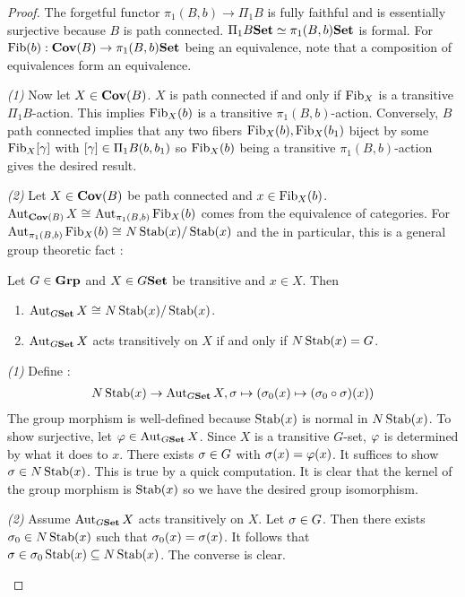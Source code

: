 \documentclass[./main.tex]{subfiles}
\begin{document}
\begin{proof}
  The forgetful functor $\pi_1(B,b) \to \Pi_1B$ is fully faithful
  and is essentially surjective because $B$ is path connected.
  $\Pi_1 B \mathbf{Set} \simeq \pi_1(B,b)\mathbf{Set}$ is formal.
  For $\operatorname{Fib}(b) : \mathbf{Cov}(B) \to \pi_1(B,b)\mathbf{Set}$ being an equivalence,
  note that a composition of equivalences form an equivalence. 

  \textit{(1)}
  Now let $X \in \mathbf{Cov}(B)$.
  $X$ is path connected if and only if $\operatorname{Fib}_X$ is a transitive 
  $\Pi_1B$-action. 
  This implies $\operatorname{Fib}_X(b)$ is a transitive $\pi_1(B,b)$-action. 
  Conversely, $B$ path connected implies 
  that any two fibers $\operatorname{Fib}_X(b), \operatorname{Fib}_X(b_1)$ biject by some 
  $\operatorname{Fib}_X[\gamma]$ with $[\gamma] \in \Pi_1B (b,b_1)$ so 
  $\operatorname{Fib}_X(b)$ being a transitive $\pi_1(B,b)$-action gives the desired result.
  
  \textit{(2)}
  Let $X \in\mathbf{Cov}(B)$ be path connected and $x \in \operatorname{Fib}_X(b)$.
  $\operatorname{Aut}_{\mathbf{Cov}(B)} X \cong_{} \operatorname{Aut}_{\pi_1(B,b)} \operatorname{Fib}_X(b)$ comes from 
  the equivalence of categories. 
  For $\operatorname{Aut}_{\pi_1(B,b)} \operatorname{Fib}_X(b) \cong_{} N\operatorname{Stab}(x)/\operatorname{Stab}(x)$
  and the in particular,
  this is a general group theoretic fact : 
  \begin{lem}
    Let $G \in \mathbf{Grp}$ and $X \in G\mathbf{Set}$ be transitive and $x \in X$.
    Then 
    \begin{enumerate}
      \item $\operatorname{Aut}_{G\mathbf{Set}} X \cong_{} N\operatorname{Stab}(x)/\operatorname{Stab}(x)$.
      \item $\operatorname{Aut}_{G\mathbf{Set}} X$ acts transitively on $X$ if and only if 
      $N\operatorname{Stab}(x) = G$.
    \end{enumerate}
    \begin{proof1}
      \textit{(1)} Define : 
      \begin{align*}
        N\operatorname{Stab}(x) \to \operatorname{Aut}_{G\mathbf{Set}} X,
        \sigma \mapsto (\sigma_0(x) \mapsto (\sigma_0 \circ \sigma)(x))
      \end{align*}
      The group morphism is well-defined 
      because $\operatorname{Stab}(x)$ is normal in $N\operatorname{Stab}(x)$.
      To show surjective, 
      let $\varphi \in \operatorname{Aut}_{G\mathbf{Set}} X$.
      Since $X$ is a transitive $G$-set,
      $\varphi$ is determined by what it does to $x$.
      There exists $\sigma \in G$ with $\sigma(x) = \varphi(x)$.
      It suffices to show $\sigma \in N\operatorname{Stab}(x)$. 
      This is true by a quick computation.
      It is clear that the kernel of the group morphism is 
      $\operatorname{Stab}(x)$ so we have the desired group isomorphism.

      \textit{(2)} Assume $\operatorname{Aut}_{G\mathbf{Set}} X$ acts transitively on $X$.
      Let $\sigma \in G$. Then there exists $\sigma_0 \in N\operatorname{Stab}(x)$
      such that $\sigma_0(x) = \sigma(x)$.
      It follows that $\sigma \in \sigma_0 \operatorname{Stab}(x) \subseteq N\operatorname{Stab}(x)$.
      The converse is clear. 
    \end{proof1}
  \end{lem}
\end{proof}
\end{document}
